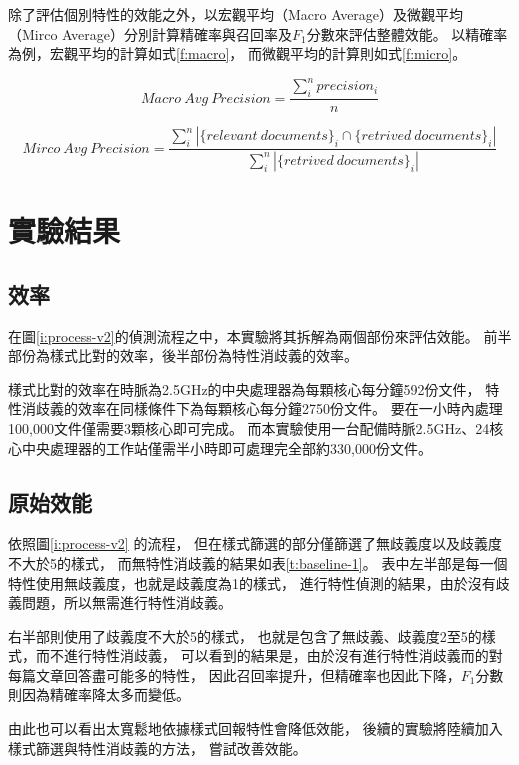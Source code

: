 除了評估個別特性的效能之外，以宏觀平均（Macro Average）及微觀平均（Mirco Average）分別計算精確率與召回率及$F_1$分數來評估整體效能。
以精確率為例，宏觀平均的計算如式\ref{f:macro}，
而微觀平均的計算則如式\ref{f:micro}。

\begin{equation}
    \label{f:macro}
    Macro\ Avg\ Precision=\frac{\sum_i^n precision_i}{n}
\end{equation}

\begin{equation}
    \label{f:micro}
    Mirco\ Avg\ Precision=\frac{\sum_i^n |\{relevant\ documents\}_i\cap\{retrived\ documents\}_i|}{\sum_i^n |\{retrived\ documents\}_i|}
\end{equation}


\section{實驗結果}
\label{s:result}

\subsection{效率}
在圖\ref{i:process-v2}的偵測流程之中，本實驗將其拆解為兩個部份來評估效能。
前半部份為樣式比對的效率，後半部份為特性消歧義的效率。

樣式比對的效率在時脈為2.5GHz的中央處理器為每顆核心每分鐘592份文件，
特性消歧義的效率在同樣條件下為每顆核心每分鐘2750份文件。
要在一小時內處理100,000文件僅需要3顆核心即可完成。
而本實驗使用一台配備時脈2.5GHz、24核心中央處理器的工作站僅需半小時即可處理完全部約330,000份文件。

\subsection{原始效能}
依照圖\ref{i:process-v2} 的流程，
但在樣式篩選的部分僅篩選了無歧義度以及歧義度不大於5的樣式，
而無特性消歧義的結果如表\ref{t:baseline-1}。
表中左半部是每一個特性使用無歧義度，也就是歧義度為1的樣式，
進行特性偵測的結果，由於沒有歧義問題，所以無需進行特性消歧義。

右半部則使用了歧義度不大於5的樣式，
也就是包含了無歧義、歧義度2至5的樣式，而不進行特性消歧義，
可以看到的結果是，由於沒有進行特性消歧義而的對每篇文章回答盡可能多的特性，
因此召回率提升，但精確率也因此下降，$F_1$分數則因為精確率降太多而變低。

由此也可以看出太寬鬆地依據樣式回報特性會降低效能，
後續的實驗將陸續加入樣式篩選與特性消歧義的方法， 嘗試改善效能。

